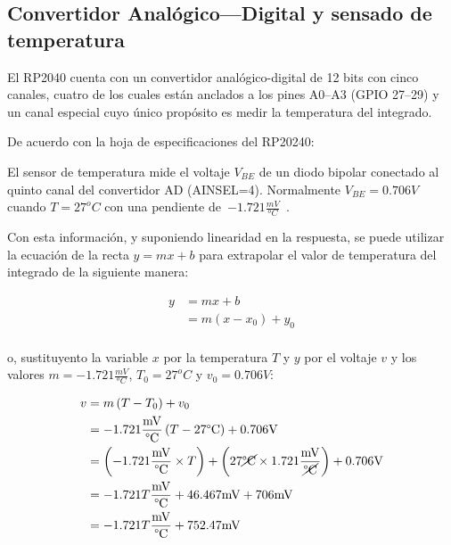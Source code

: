 %
%



\subsection{Convertidor Analógico---Digital y sensado de temperatura}%
\label{sec:intro-adc}
El RP2040 cuenta con un convertidor analógico-digital de 12 bits con cinco canales, cuatro de los cuales están anclados a los pines A0--A3 (GPIO 27--29) y un canal especial cuyo único propósito es medir la temperatura del integrado.

\noindent
De acuerdo con la hoja de especificaciones del RP20240:

\begin{displayquote}
	El sensor de temperatura mide el voltaje $V_{BE}$ de un diodo bipolar conectado al quinto canal del convertidor AD (AINSEL=4).
	Normalmente $V_{BE} = 0.706V$ cuando $T=27^{o}C$ con una pendiente de~$-1.721\frac{mV}{^{o}C}$~.
\end{displayquote}

Con esta información, y suponiendo linearidad en la respuesta, se puede utilizar la ecuación de la recta $y = mx + b$ para extrapolar el valor de temperatura del integrado de la siguiente manera:

\begin{align*}
	y &= m x + b \\
	  &= m \left(x - x_0 \right) + y_0 \\
\end{align*}

\noindent
o, sustituyento la variable $x$ por la temperatura $T$ y $y$ por el voltaje $v$ y los valores
	$m = -1.721\frac{mV}{^{o}C}$,
	$T_{0} = 27^{o}C$ y
	$v_{0} = 0.706V$:

\begin{align*}
	v &= m \left(T - T_0 \right) + v_0 \\
%
	  &= -1.721\frac{\text{mV}}{\text{°C}} \left(T - 27\text{°C} \right) + 0.706\text{V} \\
%
	  &= \left(-1.721\frac{\text{mV}}{\text{°C}} \times T  \right) +
		\left(27\cancel{\text{°C}} \times 1.721\frac{\text{mV}}{\cancel{\text{°C}}} \right) +
		0.706\text{V} \\
%
	  &= -1.721T \frac{\text{mV}}{\text{°C}} + 46.467\text{mV} + 706\text{mV} \\
%
	  &= -1.721T \frac{\text{mV}}{\text{°C}} + 752.47\text{mV} \\
\end{align*}

